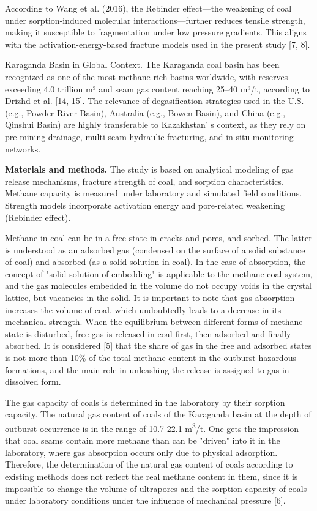 \begin{multicols}{2}
According to Wang et al. (2016), the Rebinder effect---the weakening of
coal under sorption-induced molecular interactions---further reduces
tensile strength, making it susceptible to fragmentation under low
pressure gradients. This aligns with the activation-energy-based
fracture models used in the present study {[}7, 8{]}.

Karaganda Basin in Global Context. The Karaganda coal basin has been
recognized as one of the most methane-rich basins worldwide, with
reserves exceeding 4.0 trillion m³ and seam gas content reaching 25--40
m³/t, according to Drizhd et al. {[}14, 15{]}. The relevance of
degasification strategies used in the U.S. (e.g., Powder River Basin),
Australia (e.g., Bowen Basin), and China (e.g., Qinshui Basin) are
highly transferable to Kazakhstan' s context, as they
rely on pre-mining drainage, multi-seam hydraulic fracturing, and
in-situ monitoring networks.

{\bfseries Materials and methods.} The study is based on analytical
modeling of gas release mechanisms, fracture strength of coal, and
sorption characteristics. Methane capacity is measured under laboratory
and simulated field conditions. Strength models incorporate activation
energy and pore-related weakening (Rebinder effect).

Methane in coal can be in a free state in cracks and pores, and sorbed.
The latter is understood as an adsorbed gas (condensed on the surface of
a solid substance of coal) and absorbed (as a solid solution in coal).
In the case of absorption, the concept of "solid solution of embedding"
is applicable to the methane-coal system, and the gas molecules embedded
in the volume do not occupy voids in the crystal lattice, but vacancies
in the solid. It is important to note that gas absorption increases the
volume of coal, which undoubtedly leads to a decrease in its mechanical
strength. When the equilibrium between different forms of methane state
is disturbed, free gas is released in coal first, then adsorbed and
finally absorbed. It is considered {[}5{]} that the share of gas in the
free and adsorbed states is not more than 10\% of the total methane
content in the outburst-hazardous formations, and the main role in
unleashing the release is assigned to gas in dissolved form.

The gas capacity of coals is determined in the laboratory by their
sorption capacity. The natural gas content of coals of the Karaganda
basin at the depth of outburst occurrence is in the range of 10.7‑22.1
m\textsuperscript{3}/t. One gets the impression that coal seams contain
more methane than can be "driven" into it in the laboratory, where gas
absorption occurs only due to physical adsorption. Therefore, the
determination of the natural gas content of coals according to existing
methods does not reflect the real methane content in them, since it is
impossible to change the volume of ultrapores and the sorption capacity
of coals under laboratory conditions under the influence of mechanical
pressure {[}6{]}.


\end{multicols}

